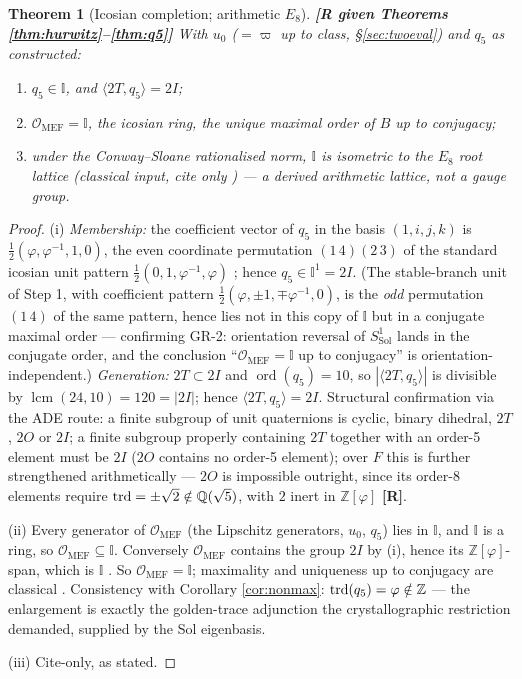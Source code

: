\documentclass[11pt,a4paper]{article}
\theoremstyle{plain}
\newtheorem{theorem}{Theorem}
\theoremstyle{definition}
\theoremstyle{remark}
\newcommand{\Ico}{\mathbb{I}}
\newcommand{\Zphi}{\mathbb{Z}[\varphi]}
\newcommand{\OrderMEF}{\mathcal{O}_{\mathrm{MEF}}}
\newcommand{\rtag}[1]{\textnormal{\textbf{[#1]}}}
\DeclareMathOperator{\trd}{trd}
\DeclareMathOperator{\ord}{ord}
\begin{document}
\begin{theorem}[Icosian completion; arithmetic $E_8$]\label{thm:icosian}
\rtag{R given Theorems \ref{thm:hurwitz}--\ref{thm:q5}} With $u_0$ ($=\varpi$ up to class, \S\ref{sec:twoeval}) and $q_5$ as constructed:
\begin{enumerate}[label=(\roman*), leftmargin=2.2em]
\item $q_5 \in \Ico$, and $\langle 2T, q_5\rangle = 2I$;
\item $\OrderMEF = \Ico$, the icosian ring, the unique maximal order of $B$ up to conjugacy;
\item under the Conway--Sloane rationalised norm, $\Ico$ is isometric to the $E_8$ root lattice \emph{(classical input, cite only \cite{ConwaySloane, Tits, MoodyPatera})} --- a derived arithmetic lattice, not a gauge group.
\end{enumerate}
\end{theorem}
\begin{proof}
(i) \emph{Membership:} the coefficient vector of $q_5$ in the basis $(1,i,j,k)$ is $\tfrac12(\varphi, \varphi^{-1}, 1, 0)$, the even coordinate permutation $(1\,4)(2\,3)$ of the standard icosian unit pattern $\tfrac12(0, 1, \varphi^{-1}, \varphi)$ \cite[ch.~8 \S2.1]{ConwaySloane}; hence $q_5 \in \Ico^1 = 2I$. (The stable-branch unit of Step 1, with coefficient pattern $\tfrac12(\varphi, \pm1, \mp\varphi^{-1}, 0)$, is the \emph{odd} permutation $(1\,4)$ of the same pattern, hence lies not in this copy of $\Ico$ but in a conjugate maximal order --- confirming GR-2: orientation reversal of $S^1_{\mathrm{Sol}}$ lands in the conjugate order, and the conclusion ``$\OrderMEF = \Ico$ up to conjugacy'' is orientation-independent.) \emph{Generation:} $2T \subset 2I$ and $\ord(q_5) = 10$, so $|\langle 2T, q_5\rangle|$ is divisible by $\operatorname{lcm}(24, 10) = 120 = |2I|$; hence $\langle 2T, q_5\rangle = 2I$. Structural confirmation via the ADE route: a finite subgroup of unit quaternions is cyclic, binary dihedral, $2T$, $2O$ or $2I$; a finite subgroup properly containing $2T$ together with an order-5 element must be $2I$ ($2O$ contains no order-5 element); over $F$ this is further strengthened arithmetically --- $2O$ is impossible outright, since its order-8 elements require $\trd = \pm\sqrt2 \notin \Q(\sqrt5)$, with $2$ inert in $\Zphi$ \rtag{R}.

(ii) Every generator of $\OrderMEF$ (the Lipschitz generators, $u_0$, $q_5$) lies in $\Ico$, and $\Ico$ is a ring, so $\OrderMEF \subseteq \Ico$. Conversely $\OrderMEF$ contains the group $2I$ by (i), hence its $\Zphi$-span, which is $\Ico$ \cite{ConwaySloane}. So $\OrderMEF = \Ico$; maximality and uniqueness up to conjugacy are classical \cite{Vigneras, Tits}. Consistency with Corollary \ref{cor:nonmax}: $\trd(q_5) = \varphi \notin \Z$ --- the enlargement is exactly the golden-trace adjunction the crystallographic restriction demanded, supplied by the Sol eigenbasis.

(iii) Cite-only, as stated.
\end{proof}
\end{document}
